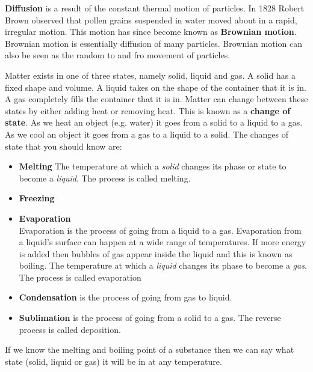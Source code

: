 \par 
\label{m38736*id10987324}\textbf{Diffusion} is a result of the constant thermal motion of particles. In 1828 Robert Brown observed that pollen grains suspended in water moved about in a rapid, irregular motion. This motion has since become known as \textbf{Brownian motion}. Brownian motion is essentially diffusion of many particles. Brownian motion can also be seen as the random to and fro movement of particles. 
\par 
\label{m38736*id48327}Matter exists in one of three states, namely solid, liquid and gas. A solid has a fixed shape and volume. A liquid takes on the shape of the container that it is in. A gas completely fills the container that it is in. Matter can change between these states by either adding heat or removing heat. This is known as a \textbf{change of state}. As we heat an object (e.g. water) it goes from a solid to a liquid to a gas. As we cool an object it goes from a gas to a liquid to a solid.
The changes of state that you should know are:
\label{m38736*id02341}\begin{itemize}[noitemsep]
\item \textbf{Melting} 
 {The temperature at which a \textsl{solid} changes its phase or state to become a \textsl{liquid}. The  process is called melting. } 
\item \textbf{Freezing} 
\item \textbf{Evaporation} \\
Evaporation is the process of going from a liquid to a gas. Evaporation from a liquid's surface can happen at a wide range of temperatures. If more energy is added then bubbles of gas appear inside the liquid and this is known as boiling.
 {The temperature at which a \textsl{liquid} changes its phase to become a \textsl{gas}. The process is called evaporation} 
\item \textbf{Condensation} is the process of going from gas to liquid.
\item \textbf{Sublimation} is the process of going from a solid to a gas. The reverse process is called deposition.\end{itemize}
\par \label{m38736*eip-957}If we know the melting and boiling point of a substance then we can say what state (solid, liquid or gas) it will be in at any temperature. \par 
